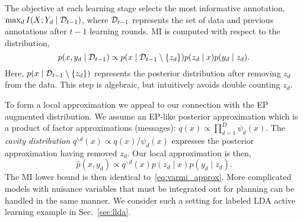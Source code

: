 The objective at each learning stage selects the most informative
annotation, \mbox{$\max_d I(X;Y_d \mid \mathcal{D}_{t-1})$}, where
$\mathcal{D}_{t-1}$ represents the set of data and previous annotations
after $t-1$ learning rounds.  MI is computed with respect to the
distribution,
\[
  p(x,y_d \mid \mathcal{D}_{t-1}) \propto p(x \mid \mathcal{D}_{t-1} \setminus \{z_d\}) p(z_d \mid
    x ) p(y_d \mid z_d).
\]
Here, $p(x \mid \mathcal{D}_{t-1} \setminus \{z_d\})$ represents the
posterior distribution after removing $z_d$ from the data.  This step
is algebraic, but intuitively avoids double counting $z_d$.

To form a local approximation we appeal to our connection with the EP
augmented distribution.  We assume an EP-like posterior approximation
which is a product of factor approximations (messages): $q(x) \propto
\prod_{d=1}^D \psi_d(x)$.  The \emph{cavity distribution}
$q^{\backslash d}(x) \propto q(x) / \psi_d(x)$ expresses the posterior
approximation having removed $z_d$.  Our local  approximation is then,
\begin{equation}
  \hat{p}(x, y_d) \propto q^{\backslash d}(x) p(z_d \mid x) p(y_d \mid z_d).
\end{equation}
The MI lower bound is then identical to~\eqref{eq:varmi_approx}.  More
complicated models with nuisance variables that must be integrated out
for planning can be handled in the same manner.  We consider such a
setting for labeled LDA active learning example in
Sec.~\ref{sec:llda}.  
